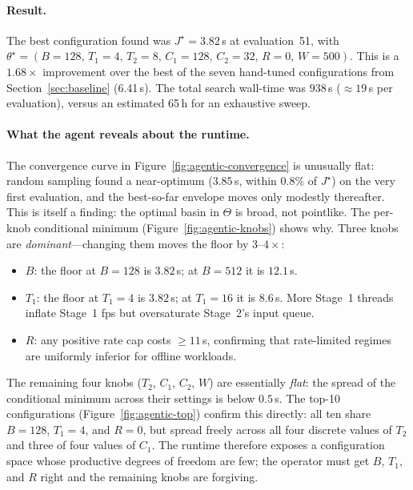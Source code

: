 \paragraph{Result.}
The best configuration found was $J^{\star} = 3.82$\,s at evaluation~51,
with
$\theta^{\star} = (B{=}128,\, T_1{=}4,\, T_2{=}8,\, C_1{=}128,\,
                   C_2{=}32,\, R{=}0,\, W{=}500)$.
This is a $1.68\times$ improvement over the best of the seven hand-tuned
configurations from Section~\ref{sec:baseline} (6.41\,s).  The total search
wall-time was $938$\,s ($\approx 19$\,s per evaluation), versus an
estimated 65\,h for an exhaustive sweep.

\paragraph{What the agent reveals about the runtime.}
The convergence curve in Figure~\ref{fig:agentic-convergence} is unusually
flat: random sampling found a near-optimum ($3.85$\,s, within $0.8\%$ of
$J^{\star}$) on the very first evaluation, and the best-so-far envelope
moves only modestly thereafter.  This is itself a finding: the optimal
basin in $\Theta$ is broad, not pointlike.  The per-knob conditional
minimum (Figure~\ref{fig:agentic-knobs}) shows why.  Three knobs are
\emph{dominant}---changing them moves the floor by $3$--$4\times$:
\begin{itemize}
  \item $B$: the floor at $B{=}128$ is $3.82$\,s; at $B{=}512$ it is
        $12.1$\,s.
  \item $T_1$: the floor at $T_1{=}4$ is $3.82$\,s; at $T_1{=}16$ it is
        $8.6$\,s.  More Stage~1 threads inflate Stage~1 fps but
        oversaturate Stage~2's input queue.
  \item $R$: any positive rate cap costs $\geq 11$\,s, confirming that
        rate-limited regimes are uniformly inferior for offline workloads.
\end{itemize}
The remaining four knobs ($T_2$, $C_1$, $C_2$, $W$) are essentially
\emph{flat}: the spread of the conditional minimum across their settings
is below $0.5$\,s.  The top-10 configurations
(Figure~\ref{fig:agentic-top}) confirm this directly: all ten share
$B{=}128$, $T_1{=}4$, and $R{=}0$, but spread freely across all four
discrete values of $T_2$ and three of four values of $C_1$.  The runtime
therefore exposes a configuration space whose productive degrees of
freedom are few; the operator must get $B$, $T_1$, and $R$ right and the
remaining knobs are forgiving.

